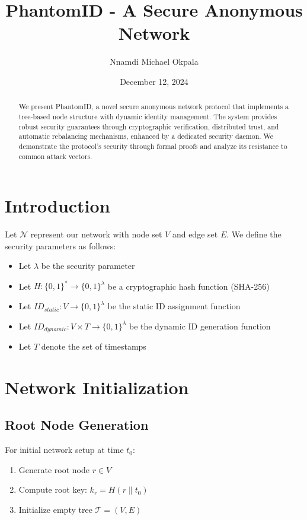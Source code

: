 \documentclass[12pt]{article}
\title{PhantomID - A Secure Anonymous Network}
\author{Nnamdi Michael Okpala}
\date{December 12, 2024}
\theoremstyle{definition}
\theoremstyle{remark}
\begin{document}
\maketitle

\begin{abstract}
We present PhantomID, a novel secure anonymous network protocol that implements a tree-based node structure with dynamic identity management. The system provides robust security guarantees through cryptographic verification, distributed trust, and automatic rebalancing mechanisms, enhanced by a dedicated security daemon. We demonstrate the protocol's security through formal proofs and analyze its resistance to common attack vectors.
\end{abstract}

\section{Introduction}
Let $\mathcal{N}$ represent our network with node set $V$ and edge set $E$. We define the security parameters as follows:
\begin{itemize}
    \item Let $\lambda$ be the security parameter
    \item Let $H: \{0,1\}^* \rightarrow \{0,1\}^\lambda$ be a cryptographic hash function (SHA-256)
    \item Let $ID_{static}: V \rightarrow \{0,1\}^\lambda$ be the static ID assignment function
    \item Let $ID_{dynamic}: V \times T \rightarrow \{0,1\}^\lambda$ be the dynamic ID generation function
    \item Let $T$ denote the set of timestamps
\end{itemize}

\section{Network Initialization}

\subsection{Root Node Generation}
For initial network setup at time $t_0$:
\begin{enumerate}
    \item Generate root node $r \in V$
    \item Compute root key: $k_r = H(r \parallel t_0)$
    \item Initialize empty tree $\mathcal{T} = (V, E)$
\end{enumerate}
\end{document}
